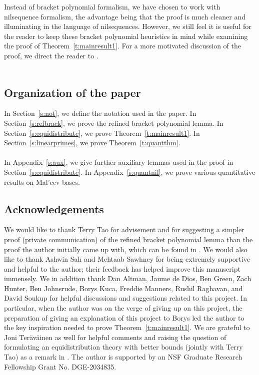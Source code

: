 \documentclass[11pt, a4paper]{amsart}
\theoremstyle{plain}
\theoremstyle{plain}
\theoremstyle{definition}
\theoremstyle{remark}
\numberwithin{equation}{section}
\numberwithin{lemma}{section}
\numberwithin{proposition}{section}
\numberwithin{corollary}{section}
\numberwithin{definition}{section}
\numberwithin{claim}{section}
\begin{document}
Instead of bracket polynomial formalism, we have chosen to work with nilsequence formalism, the advantage being that the proof is much cleaner and illuminating in the language of nilsequences. However, we still feel it is useful for the reader to keep these bracket polynomial heuristics in mind while examining the proof of Theorem~\ref{t:mainresult1}. For a more motivated discussion of the proof, we direct the reader to \cite{LenNew}. \\\\


\subsection{Organization of the paper}
In Section~\ref{s:not}, we define the notation used in the paper. In Section~\ref{s:refbrack}, we prove the refined bracket polynomial lemma. In Section~\ref{s:equidistribute}, we prove Theorem~\ref{t:mainresult1}. In Section~\ref{s:linearprimes}, we prove Theorem~\ref{t:quantthm}. \\\\
In Appendix~\ref{s:aux}, we give further auxiliary lemmas used in the proof in Section~\ref{s:equidistribute}. In Appendix~\ref{s:quantnil}, we prove various quantitative results on Mal'cev bases.

\subsection{Acknowledgements}
We would like to thank Terry Tao for advisement and for suggesting a simpler proof (private communication) of the refined bracket polynomial lemma than the proof the author initially came up with, which can be found in \cite[Appendix C]{LenNew}. We would also like to thank Ashwin Sah and Mehtaab Sawhney for being extremely supportive and helpful to the author; their feedback has helped improve this manuscript immensely. We in addition thank Dan Altman, Jaume de Dios, Ben Green, Zach Hunter, Ben Johnsrude, Borys Kuca, Freddie Manners, Rushil Raghavan, and David Soukup for helpful discussions and suggestions related to this project. In particular, when the author was on the verge of giving up on this project, the preparation of giving an explanation of this project to Borys led the author to the key inspiration needed to prove Theorem~\ref{t:mainresult1}. We are grateful to Joni Ter\"av\"ainen as well for helpful comments and raising the question of formulating an equidistribution theory with better bounds (jointly with Terry Tao) as a remark in \cite{TT21}. The author is supported by an NSF Graduate Research Fellowship Grant No. DGE-2034835.
\end{document}
